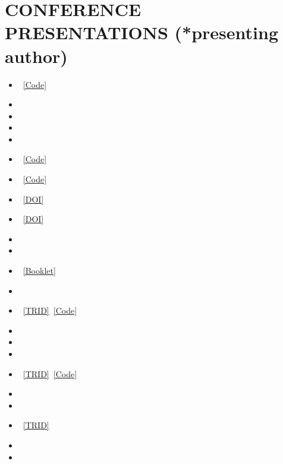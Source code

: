\documentclass[letterpaper,11pt]{article}
\newcommand{\doiLink}[1]{\href{https://doi.org/#1}{[DOI]}}
\newcommand{\codeLink}[1]{\href{#1}{[Code]}}
\newcommand{\tridLink}[1]{\href{#1}{[TRID]}}
\newcommand{\bookletLink}[1]{\href{#1}{[Booklet]}}
\begin{document}
\section{CONFERENCE PRESENTATIONS (*presenting author)}
\begin{itemize}[leftmargin=0.15in, label={}]
    \setlength{\itemsep}{-1pt}
    \item {}~\codeLink{https://github.com/pebeigi/NGM}
    \item {}
    \item {}
    \item {}
    \item {}

    \item {}~\codeLink{https://github.com/pebeigi/MaC-PDWM}
    \item {}~\codeLink{https://github.com/pebeigi/AV-SysVal}

    \item {}~\doiLink{10.21949/z9f1-m111}
    \item {}~\doiLink{10.21949/1qgs-s409}
    \item {}
    
    \item {}

    \item {}~\bookletLink{https://transportation.tech.northwestern.edu/docs/trb-memorial-booklet-print.pdf}
    \item {}
    \item {}~\tridLink{https://trid.trb.org/View/2646170}~\codeLink{https://github.com/wissamsleiman/Deep-Reinforcement-Learning-for-Traffic-Signal-Control}
    \item {}
    
    \item {}
    \item {}
    \item {}~\tridLink{https://trid.trb.org/View/2543459}~\codeLink{https://github.com/pebeigi/Paper_Impact_of_Heavy_Vehicles_on_Headway}
    \item {}
    \item {}
    \item {}~\tridLink{https://trid.trb.org/View/2408338}
    \item {}
    \item {}

\end{itemize}
\end{document}
